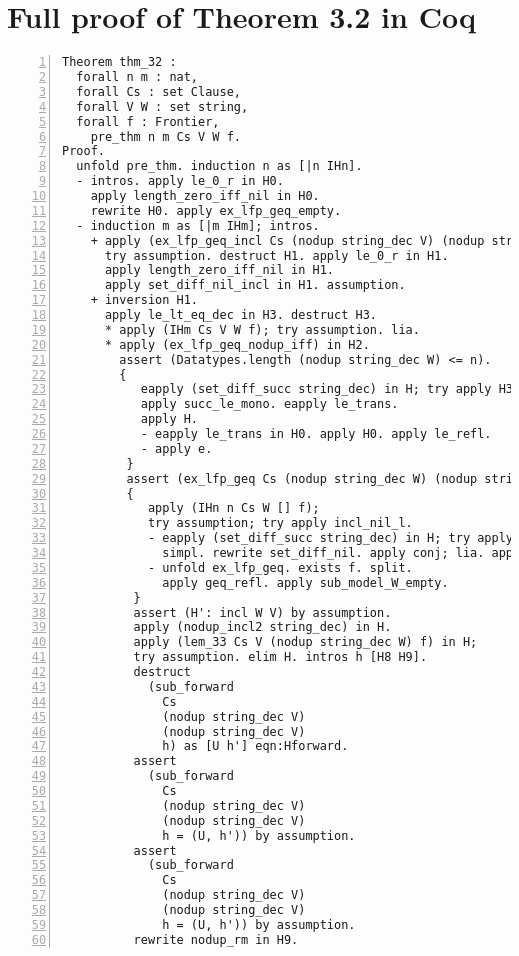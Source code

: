 \chapter{Full proof of Theorem 3.2 in Coq}

\begin{lstlisting}[language=Coq, label={lst:thm_32_full_proof}, caption={Full proof of Theorem 3.2 in Coq}, numbers=left]
Theorem thm_32 :
  forall n m : nat,
  forall Cs : set Clause,
  forall V W : set string,
  forall f : Frontier,
    pre_thm n m Cs V W f.
Proof.
  unfold pre_thm. induction n as [|n IHn].
  - intros. apply le_0_r in H0.
    apply length_zero_iff_nil in H0.
    rewrite H0. apply ex_lfp_geq_empty.
  - induction m as [|m IHm]; intros.
    + apply (ex_lfp_geq_incl Cs (nodup string_dec V) (nodup string_dec W));
      try assumption. destruct H1. apply le_0_r in H1.
      apply length_zero_iff_nil in H1.
      apply set_diff_nil_incl in H1. assumption.
    + inversion H1.
      apply le_lt_eq_dec in H3. destruct H3.
      * apply (IHm Cs V W f); try assumption. lia.
      * apply (ex_lfp_geq_nodup_iff) in H2.
        assert (Datatypes.length (nodup string_dec W) <= n).
        {
           eapply (set_diff_succ string_dec) in H; try apply H3.
           apply succ_le_mono. eapply le_trans.
           apply H.
           - eapply le_trans in H0. apply H0. apply le_refl.
           - apply e.
         }
         assert (ex_lfp_geq Cs (nodup string_dec W) (nodup string_dec W) f).
         {
            apply (IHn n Cs W [] f);
            try assumption; try apply incl_nil_l.
            - eapply (set_diff_succ string_dec) in H; try apply H3.
              simpl. rewrite set_diff_nil. apply conj; lia. apply e.
            - unfold ex_lfp_geq. exists f. split.
              apply geq_refl. apply sub_model_W_empty.
          }
          assert (H': incl W V) by assumption.
          apply (nodup_incl2 string_dec) in H.
          apply (lem_33 Cs V (nodup string_dec W) f) in H;
          try assumption. elim H. intros h [H8 H9].
          destruct
            (sub_forward
              Cs
              (nodup string_dec V)
              (nodup string_dec V)
              h) as [U h'] eqn:Hforward.
          assert
            (sub_forward
              Cs
              (nodup string_dec V)
              (nodup string_dec V)
              h = (U, h')) by assumption.
          assert
            (sub_forward
              Cs
              (nodup string_dec V)
              (nodup string_dec V)
              h = (U, h')) by assumption.
          rewrite nodup_rm in H9.

\end{lstlisting}
